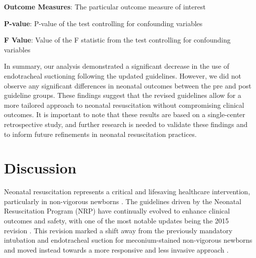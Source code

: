 \documentclass[11pt]{article}
\begin{document}
\begin{table}[h]
\caption{Comparison of Neonatal Outcomes Pre and Post Guideline Changes}
\label{table:compare_outcomes}
\begin{threeparttable}
\renewcommand{\TPTminimum}{\linewidth}
\begin{tablenotes}
\footnotesize
\item \textbf{Outcome Measures}: The particular outcome measure of interest
\item \textbf{P-value}: P-value of the test controlling for confounding variables
\item \textbf{F Value}: Value of the F statistic from the test controlling for confounding variables
\end{tablenotes}
\end{threeparttable}
\end{table}


In summary, our analysis demonstrated a significant decrease in the use of endotracheal suctioning following the updated guidelines. However, we did not observe any significant differences in neonatal outcomes between the pre and post guideline groups. These findings suggest that the revised guidelines allow for a more tailored approach to neonatal resuscitation without compromising clinical outcomes. It is important to note that these results are based on a single-center retrospective study, and further research is needed to validate these findings and to inform future refinements in neonatal resuscitation practices.

\section*{Discussion}

Neonatal resuscitation represents a critical and lifesaving healthcare intervention, particularly in non-vigorous newborns \cite{Lee2011NeonatalRA}. The guidelines driven by the Neonatal Resuscitation Program (NRP) have continually evolved to enhance clinical outcomes and safety, with one of the most notable updates being the 2015 revision \cite{Halamek2008EducationalPT}. This revision marked a shift away from the previously mandatory intubation and endotracheal suction for meconium-stained non-vigorous newborns and moved instead towards a more responsive and less invasive approach \cite{Wyckoff2015Part1N}.
\end{document}
